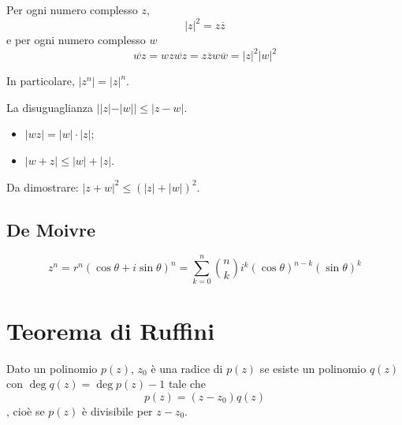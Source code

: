 \documentclass[a4paper]{article}
\begin{document}

Per ogni numero complesso \(z\),
\[
    {|z|}^2 = z\overline{z}
\]
e per ogni numero complesso \(w\)
\[
    \overline{wz} = wz\overline{wz} = z\overline{z}w\overline{w} = |z|^2|w|^2
\]

In particolare, \(|z^n| = |z|^n\).

La disuguaglianza \(||z| - |w|| \leq |z-w|\).

\begin{itemize}
    \item \(|wz| = |w|\cdot|z|\);
    \item \(|w+z| \leq |w| + |z|\).
\end{itemize}


Da dimostrare: \(|z+w|^2 \leq {(|z| + |w|)}^2\).

\subsection{De Moivre}

\[
    z^n = r^n {(\cos \theta + i\sin\theta)}^n = \sum_{k=0}^n \binom{n}{k}
    i^k {(\cos\theta)}^{n-k}{(\sin\theta)}^k
\]

\section{Teorema di Ruffini}

Dato un polinomio \(p(z)\), \(z_0\) è una radice di \(p(z)\) se esiste
un polinomio \(q(z)\) con \(\deg q(z) = \deg p(z) - 1\)
tale che \[p(z) = (z-z_0)q(z)\], cioè se \(p(z)\) è divisibile per \(z-z_0\).
\end{document}
